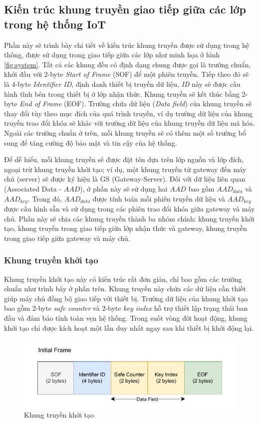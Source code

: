 \subsection{Kiến trúc khung truyền giao tiếp giữa các lớp trong hệ thống IoT}
\label{sec:frame}
Phần này sẽ trình bày chi tiết về kiến trúc khung truyền được sử dụng trong hệ thống, được sử dụng trong giao tiếp giữa các lớp như minh họa ở hình \ref{fig:system}. Tất cả các khung đều có định dạng chung được gọi là trường chuẩn, khởi đầu với 2-byte \textit{Start of Frame} (SOF) để một phiên truyền. Tiếp theo đó sẽ là 4-byte \textit{Identifier ID}, định danh thiết bị truyền dữ liệu, \textit{ID} này sẽ được cấu hình tĩnh bên trong thiết bị ở lớp nhận thức. Khung truyền sẽ kết thúc bằng 2-byte \textit{End of Frame} (EOF). Trường chứa dữ liệu (\textit{Data field}) của khung truyền sẽ thay đổi tùy theo mục đích của quá trình truyền, ví dụ trường dữ liệu của khung truyền trao đổi khóa sẽ khác với trường dữ liệu của khung truyền dữ liệu mã hóa. Ngoài các trường chuẩn ở trên, mỗi khung truyền sẽ có thêm một số trường bổ sung để tăng cường độ bảo mật và tin cậy của hệ thống. 

Để dễ hiểu, mỗi khung truyền sẽ được đặt tên dựa trên lớp nguồn và lớp đích, ngoại trừ khung truyền khởi tạo; ví dụ, một khung truyền từ gateway đến máy chủ (server) sẽ được ký hiệu là GS (Gateway-Server). Đối với dữ liệu liên quan (Associated Data - $AAD$), ở phần này sẽ sử dụng hai $AAD$ bao gồm $AAD_{data}$ và $AAD_{key}$. Trong đó, $AAD_{data}$ được tính toán mỗi phiên truyền dữ liệu và $AAD_{key}$ được cấu hình sẵn và sử dụng trong các phiên trao đổi khóa giữa gateway và máy chủ. Phần này sẽ chia các khung truyền thành ba nhóm chính: khung truyền khởi tạo, khung truyền trong giao tiếp giữa lớp nhận thức và gateway, khung truyền trong giao tiếp giữa gateway và máy chủ.
\subsubsection{Khung truyền khởi tạo}
Khung truyền khởi tạo này có kiến trúc rất đơn giản, chỉ bao gồm các trường chuẩn như trình bày ở phần trên. Khung truyền này chứa các dữ liệu cần thiết giúp máy chủ đồng bộ giao tiếp với thiết bị. Trường dữ liệu của khung khởi tạo bao gồm 2-byte \textit{safe counter} và 2-byte \textit{key index} hỗ trợ thiết lập trạng thái ban đầu và đảm bảo tính toàn vẹn hệ thống. Trong suốt vòng đời hoạt động, khung khởi tạo chỉ được kích hoạt một lần duy nhất ngay sau khi thiết bị khởi động lại.
\begin{figure}[H]
    \centering
    \includegraphics[width=0.6\linewidth]{init-frame.pdf}
    \caption{Khung truyền khởi tạo}
    \label{fig:init-frame}
\end{figure}

